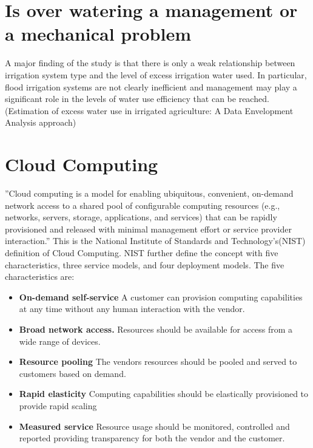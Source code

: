 \documentclass[]{uiophd}
\begin{document}
\section{Is over watering a management or a mechanical problem}
A major finding of the study is that there is only a weak relationship between irrigation
system type and the level of excess irrigation water used. In particular, flood irrigation
systems are not clearly inefficient and management may play a significant role in the levels
of water use efficiency that can be reached.(Estimation of excess water use in irrigated agriculture:
A Data Envelopment Analysis approach)
 
\section{Cloud Computing}
''Cloud computing is a model for enabling ubiquitous, convenient, on-demand network access to a shared pool of configurable computing resources (e.g., networks, servers, storage, applications, and services) that can be rapidly provisioned and released with minimal management effort or service provider interaction.''\cite{Mell:2011:SND:2206223} This is the National Institute of Standards and Technology's(NIST) definition of Cloud Computing. NIST further define the concept with five characteristics, three service models, and four deployment models\cite{Mell:2011:SND:2206223}. The five characteristics are:
\begin{itemize}
\item \textbf{On-demand self-service} A customer can provision computing capabilities at any time without any human interaction with the vendor.
\item \textbf{Broad network access.} Resources should be available for access from a wide range of devices.
\item \textbf{Resource pooling} The vendors resources should be pooled and served to customers based on demand.
\item \textbf{Rapid elasticity} Computing capabilities should be elastically provisioned to provide rapid scaling 
\item \textbf{Measured service} Resource usage should be monitored, controlled and reported providing transparency for both the vendor and the customer.
\end{itemize}
\end{document}
